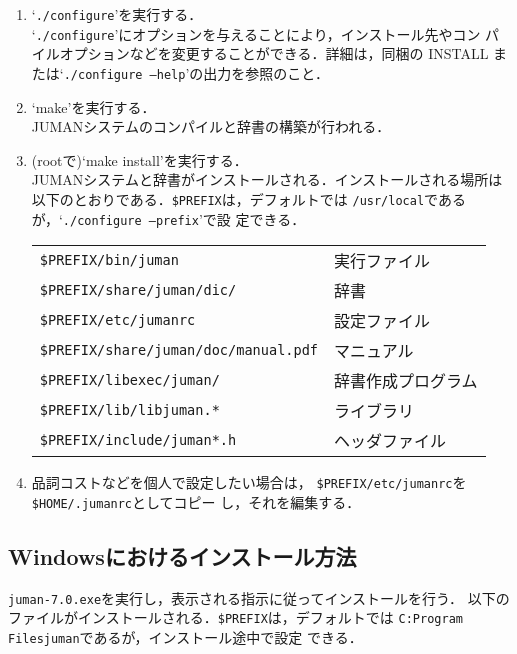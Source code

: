 \documentclass[a4j,titlepage]{jarticle}
\begin{document}
\begin{enumerate}
 \item `\texttt{./configure}'を実行する．\\
       `\texttt{./configure}'にオプションを与えることにより，インストール先やコン
      パイルオプションなどを変更することができる．詳細は，同梱の INSTALL 
       または`\texttt{./configure --help}'の出力を参照のこと．
 \item `make'を実行する．\\
       JUMANシステムのコンパイルと辞書の構築が行われる．
 \item (rootで)`make install'を実行する．\\
       JUMANシステムと辞書がインストールされる．インストールされる場所は
       以下のとおりである．\texttt{\$PREFIX}は，デフォルトでは
       \texttt{/usr/local}であるが，`\texttt{./configure --prefix}'で設
       定できる．

       \begin{tabular}{ll}
	\texttt{\$PREFIX/bin/juman} & 実行ファイル \\
	\texttt{\$PREFIX/share/juman/dic/} & 辞書 \\
	\texttt{\$PREFIX/etc/jumanrc} & 設定ファイル \\
	\texttt{\$PREFIX/share/juman/doc/manual.pdf} & マニュアル \\
	\texttt{\$PREFIX/libexec/juman/} & 辞書作成プログラム \\
	\texttt{\$PREFIX/lib/libjuman.*} & ライブラリ \\
	\texttt{\$PREFIX/include/juman*.h} & ヘッダファイル \\
       \end{tabular}
 \item 品詞コストなどを個人で設定したい場合は，
       \texttt{\$PREFIX/etc/jumanrc}を\texttt{\$HOME/.jumanrc}としてコピー
       し，それを編集する．
\end{enumerate}


\subsection{Windowsにおけるインストール方法}

\texttt{juman-7.0.exe}を実行し，表示される指示に従ってインストールを行う．
以下のファイルがインストールされる．\texttt{\$PREFIX}は，デフォルトでは
\texttt{C:\yen Program Files\yen juman}であるが，インストール途中で設定
できる．
\end{document}
